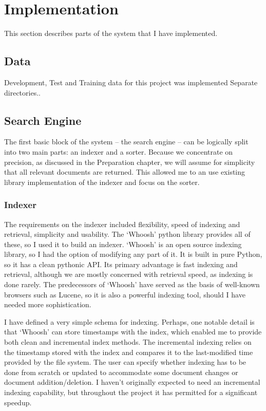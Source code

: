 \documentclass[12pt,twoside,notitlepage]{report}
\begin{document}
\chapter{Implementation}
This section describes parts of the system that I have implemented.

\section{Data}
Development, Test and Training data for this project was implemented
Separate directories..

\section{Search Engine}

The first basic block of the system -- the search engine -- can be logically
split into two main parts: an indexer and a sorter. Because we concentrate on
precision, as discussed in the Preparation chapter, we will assume for
simplicity that all relevant documents are returned. This allowed me to an use
existing library implementation of the indexer and focus on the sorter.

\subsection*{Indexer}

The requirements on the indexer included flexibility, speed of indexing and
retrieval, simplicity and usability.  The `Whoosh' python library provides all
of these, so I used it to build an indexer. `Whoosh' is an open source indexing
library, so I had the option of modifying any part of it. It is  built in pure
Python, so it has a clean pythonic API. Its primary advantage is fast indexing
and retrieval, although we are mostly concerned with retrieval speed, as
indexing is done rarely. The predecessors of `Whoosh' have served as the basis
of well-known browsers such as Lucene, so it is also a powerful indexing tool,
should I have needed more sophistication.

I have defined a very simple schema for indexing. Perhaps, one notable detail
is that `Whoosh' can store timestamps with the index, which enabled me to
provide both clean and incremental index methods. The incremental indexing
relies on the timestamp stored with the index and compares it to the
last-modified time provided by the file system. The user can specify whether
indexing has to be done from scratch or updated to accommodate some document
changes or document addition/deletion. I haven't originally expected to need an
incremental indexing capability, but throughout the project it has permitted
for a significant speedup.
\end{document}
